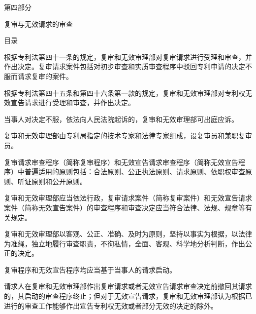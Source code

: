 \cleardoublepage{}\resetchapters
\thispagestyle{plainempty}\hypertarget{gpos.p4}{}\begingroup\centering\guidecenterpage
\dadati\fontsize{29.04bp}{43bp}\selectfont
\vspace*{242bp}
第四部分\par
复审与无效请求的审查\par
{}
{}
\endgroup\clearpage
\cleardoublepage\pagestyle{tocpage}
\gdef\guidetabcontent{\hbox{第}\hbox{四}\hbox{部}\hbox{分}}
{\centering\guidecenterpage\heiti\fontsize{14.04bp}{21bp}\selectfont 目\quad 录\par}
\vspace{6bp}
\clearpage\pagestyle{main}
根据专利法第四十一条的规定，复审和无效审理部对复审请求进行受理和审查，并作出决定。复审请求案件包括对初步审查和实质审查程序中驳回专利申请的决定不服而请求复审的案件。

根据专利法第四十五条和第四十六条第一款的规定，复审和无效审理部对专利权无效宣告请求进行受理和审查，并作出决定。

当事人对决定不服，依法向人民法院起诉的，复审和无效审理部可出庭应诉。

复审和无效审理部由专利局指定的技术专家和法律专家组成，设复审员和兼职复审员。

复审请求审查程序（简称复审程序）和无效宣告请求审查程序（简称无效宣告程序）中普遍适用的原则包括：合法原则、公正执法原则、请求原则、依职权审查原则、听证原则和公开原则。

复审和无效审理部应当依法行政，复审请求案件（简称复审案件）和无效宣告请求案件（简称无效宣告案件）的审查程序和审查决定应当符合法律、法规、规章等有关规定。

复审和无效审理部以客观、公正、准确、及时为原则，坚持以事实为根据，以法律为准绳，独立地履行审查职责，不徇私情，全面、客观、科学地分析判断，作出公正的决定。

复审程序和无效宣告程序均应当基于当事人的请求启动。

请求人在复审和无效审理部作出复审请求或者无效宣告请求审查决定前撤回其请求的，其启动的审查程序终止；但对于无效宣告请求，复审和无效审理部认为根据已进行的审查工作能够作出宣告专利权无效或者部分无效的决定的除外。

